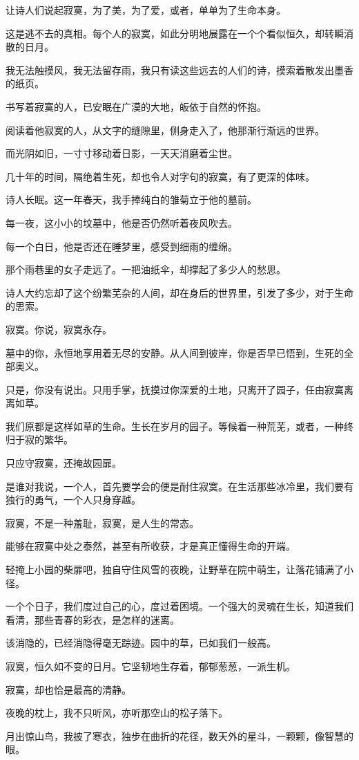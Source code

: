 		\vspace{1em}
		让诗人们说起寂寞，为了美，为了爱，或者，单单为了生命本身。\par
		这是逃不去的真相。每个人的寂寞，如此分明地展露在一个个看似恒久，却转瞬消散的日月。\par
		我无法触摸风，我无法留存雨，我只有读这些远去的人们的诗，摸索着散发出墨香的纸页。\par
		书写着寂寞的人，已安眠在广漠的大地，皈依于自然的怀抱。\par
		阅读着他寂寞的人，从文字的缝隙里，侧身走入了，他那渐行渐远的世界。\par
		而光阴如旧，一寸寸移动着日影，一天天消磨着尘世。\par
		几十年的时间，隔绝着生死，却也令人对字句的寂寞，有了更深的体味。\par
		诗人长眠。这一年春天，我手捧纯白的雏菊立于他的墓前。\par
		每一夜，这小小的坟墓中，他是否仍然听着夜风吹去。\par
		每一个白日，他是否还在睡梦里，感受到细雨的缠绵。\par
		那个雨巷里的女子走远了。一把油纸伞，却撑起了多少人的愁思。\par
		诗人大约忘却了这个纷繁芜杂的人间，却在身后的世界里，引发了多少，对于生命的思索。\par
		寂寞。你说，寂寞永存。\par
		墓中的你，永恒地享用着无尽的安静。从人间到彼岸，你是否早已悟到，生死的全部奥义。\par
		只是，你没有说出。只用手掌，抚摸过你深爱的土地，只离开了园子，任由寂寞离离如草。

		\vspace{1em}
		我们原都是这样如草的生命。生长在岁月的园子。等候着一种荒芜，或者，一种终归于寂的繁华。\par
		只应守寂寞，还掩故园扉。\par
		是谁对我说，一个人，首先要学会的便是耐住寂寞。在生活那些冰冷里，我们要有独行的勇气，一个人只身穿越。\par
		寂寞，不是一种羞耻，寂寞，是人生的常态。\par
		能够在寂寞中处之泰然，甚至有所收获，才是真正懂得生命的开端。\par
		轻掩上小园的柴扉吧，独自守住风雪的夜晚，让野草在院中萌生，让落花铺满了小径。\par
		一个个日子，我们度过自己的心，度过着困境。一个强大的灵魂在生长，知道我们看清，那些青春的彩衣，是怎样的迷离。\par
		该消隐的，已经消隐得毫无踪迹。园中的草，已如我们一般高。\par
		寂寞，恒久如不变的日月。它坚韧地生存着，郁郁葱葱，一派生机。\par
		寂寞，却也恰是最高的清静。\par
		夜晚的枕上，我不只听风，亦听那空山的松子落下。\par
		月出惊山鸟，我披了寒衣，独步在曲折的花径，数天外的星斗，一颗颗，像智慧的眼。

